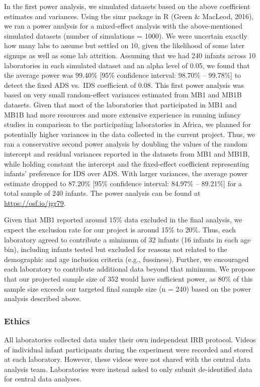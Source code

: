 \documentclass[
  english,
  ,man,floatsintext]{apa6}
\begin{document}
In the first power analysis, we simulated datasets based on the above coefficient estimates and variances. Using the simr package in R (Green \& MacLeod, 2016), we ran a power analysis for a mixed-effect analysis with the above-mentioned simulated datasets (number of simulations = 1000). We were uncertain exactly how many labs to assume but settled on 10, given the likelihood of some later signups as well as some lab attrition. Assuming that we had 240 infants across 10 laboratories in each simulated dataset and an alpha level of 0.05, we found that the average power was 99.40\% {[}95\% confidence interval: 98.70\% -- 99.78\%{]} to detect the fixed ADS vs.~IDS coefficient of 0.08. This first power analysis was based on very small random-effect variances estimated from MB1 and MB1B datasets. Given that most of the laboratories that participated in MB1 and MB1B had more resources and more extensive experience in running infancy studies in comparison to the participating laboratories in Africa, we planned for potentially higher variances in the data collected in the current project. Thus, we ran a conservative second power analysis by doubling the values of the random intercept and residual variances reported in the datasets from MB1 and MB1B, while holding constant the intercept and the fixed-effect coefficient representing infants' preference for IDS over ADS. With larger variances, the average power estimate dropped to 87.20\% {[}95\% confidence interval: 84.97\% -- 89.21\%{]} for a total sample of 240 infants. The power analysis can be found at \href{}{https://osf.io/jgr79}.

Given that MB1 reported around 15\% data excluded in the final analysis, we expect the exclusion rate for our project is around 15\% to 20\%. Thus, each laboratory agreed to contribute a minimum of 32 infants (16 infants in each age bin), including infants tested but excluded for reasons not related to the demographic and age inclusion criteria (e.g., fussiness). Further, we encouraged each laboratory to contribute additional data beyond that minimum. We propose that our projected sample size of 352 would have sufficient power, as 80\% of this sample size exceeds our targeted final sample size (n = 240) based on the power analysis described above.

\subsubsection{Ethics}\label{ethics}

All laboratories collected data under their own independent IRB protocol. Videos of individual infant participants during the experiment were recorded and stored at each laboratory. However, these videos were not shared with the central data analysis team. Laboratories were instead asked to only submit de-identified data for central data analyses.
\end{document}
